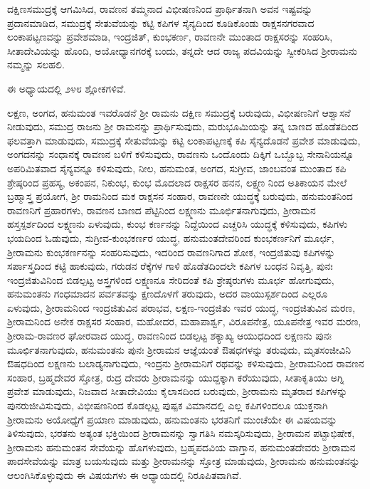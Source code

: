 ದಕ್ಷಿಣಸಮುದ್ರಕ್ಕೆ ಆಗಮಿಸಿದ, ರಾವಣನ ತಮ್ಮನಾದ ವಿಭೀಷಣನಿಂದ ಪ್ರಾರ್ಥಿತನಾಗಿ ಅವನ ಇಷ್ಟವನ್ನು ಪ್ರದಾನಮಾಡಿದ, ಸಮುದ್ರಕ್ಕೆ ಸೇತುವೆಯನ್ನು ಕಟ್ಟಿ ಕಪಿಗಳ ಸೈನ್ಯದಿಂದ ಕೂಡಿಕೊಂಡು ರಾಕ್ಷಸನಗರವಾದ ಲಂಕಾಪಟ್ಟಣವನ್ನು ಪ್ರವೇಶಮಾಡಿ, ಇಂದ್ರಜಿತ್, ಕುಂಭಕರ್ಣ, ರಾವಣನೇ ಮುಂತಾದ ರಾಕ್ಷಸರನ್ನು ಸಂಹರಿಸಿ, ಸೀತಾದೇವಿಯನ್ನು ಹೊಂದಿ, ಅಯೋಧ್ಯಾನಗರಕ್ಕೆ ಬಂದು, ತನ್ನದೇ ಆದ ರಾಜ್ಯ ಪದವಿಯನ್ನು ಸ್ವೀಕರಿಸಿದ ಶ‍್ರೀರಾಮನು ನಮ್ಮನ್ನು ಸಲಹಲಿ.

ಈ ಅಧ್ಯಾಯದಲ್ಲಿ ೨೪೮ ಶ್ಲೋಕಗಳಿವೆ.

ಲಕ್ಷಣ, ಅಂಗದ, ಹನುಮಂತ ಇವರೊಡನೆ ಶ‍್ರೀ ರಾಮನು ದಕ್ಷಿಣ ಸಮುದ್ರಕ್ಕೆ ಬರುವುದು, ವಿಭೀಷಣನಿಗೆ ಆಶ್ವಾಸನೆ ನೀಡುವುದು, ಸಮುದ್ರ ರಾಜನು ಶ‍್ರೀ ರಾಮನನ್ನು ಪ್ರಾರ್ಥಿಸುವುದು, ಮರುಭೂಮಿಯನ್ನು ತನ್ನ ಬಾಣದ ಹೊಡೆತದಿಂದ ಫಲವತ್ತಾಗಿ ಮಾಡುವುದು, ಸಮುದ್ರಕ್ಕೆ ಸೇತುವೆಯನ್ನು ಕಟ್ಟಿ ಲಂಕಾಪಟ್ಟಣಕ್ಕೆ ಕಪಿ ಸೈನ್ಯದೊಡನೆ ಪ್ರವೇಶ ಮಾಡುವುದು, ಅಂಗದನನ್ನು ಸಂಧಾನಕ್ಕೆ ರಾವಣನ ಬಳಿಗೆ ಕಳಿಸುವುದು, ರಾವಣನು ಒಂದೊಂದು ದಿಕ್ಕಿಗೆ ಒಬ್ಬೊಬ್ಬ ಸೇನಾನಿಯನ್ನೂ ಅಪರಿಮಿತವಾದ ಸೈನ್ಯವನ್ನೂ ಕಳಿಸುವುದು, ನೀಲ, ಹನುಮಂತ, ಅಂಗದ, ಸುಗ್ರೀವ, ಜಾಂಬವಂತ ಮುಂತಾದ ಕಪಿ ಶ್ರೇಷ್ಠರಿಂದ ಪ್ರಹಸ್ಯ, ಅಕಂಪನ, ನಿಕುಂಭ, ಕುಂಭ ಮೊದಲಾದ ರಾಕ್ಷಸರ ಹನನ, ಲಕ್ಷ್ಮಣ ನಿಂದ ಅತಿಕಾಯನ ಮೇಲೆ ಬ್ರಹ್ಮಾಸ್ತ್ರ ಪ್ರಯೋಗ, ಶ‍್ರೀ ರಾಮನಿಂದ ಮಕ ರಾಕ್ಷಸನ ಸಂಹಾರ, ರಾವಣನೇ ಯುದ್ಧಕ್ಕೆ ಬರುವುದು, ಹನುಮಂತನಿಂದ ರಾವಣನಿಗೆ ಪ್ರಹಾರಗಳು, ರಾವಣನ ಬಾಣದ ಪೆಟ್ಟಿನಿಂದ ಲಕ್ಷ್ಮಣನು ಮೂರ್ಛಿತನಾಗುವುದು, ಶ‍್ರೀರಾಮನ ಹಸ್ತಸ್ಪರ್ಶದಿಂದ ಲಕ್ಷ್ಮಣನು ಏಳುವುದು, ಕುಂಭ ಕರ್ಣನನ್ನು ನಿದ್ದೆಯಿಂದ ಎಚ್ಚರಿಸಿ ಯುದ್ಧಕ್ಕೆ ಕಳಿಸುವುದು, ಕಪಿಗಳು ಭಯದಿಂದ ಓಡುವುದು, ಸುಗ್ರೀವ-ಕುಂಭಕರ್ಣರ ಯುದ್ಧ, ಹನುಮಂತದೇವರಿಂದ ಕುಂಭಕರ್ಣನಿಗೆ ಮೂರ್ಛ, ಶ‍್ರೀರಾಮನು ಕುಂಭಕರ್ಣನನ್ನು ಸಂಹರಿಸುವುದು, ಇದರಿಂದ ರಾವಣನಿಗಾದ ಶೋಕ, ಇಂದ್ರಜಿತುವು ಕಪಿಗಳನ್ನು ಸರ್ಪಾಸ್ತ್ರದಿಂದ ಕಟ್ಟಿ ಹಾಕುವುದು, ಗರುಡನ ರೆಕ್ಕೆಗಳ ಗಾಳಿ ಹೊಡೆತದಿಂದಲೇ ಕಪಿಗಳ ಬಂಧನ ನಿವೃತ್ತಿ, ಪುನಃ ಇಂದ್ರಜಿತುವಿನಿಂದ ಬಿಡಲ್ಪಟ್ಟ ಅಸ್ತ್ರಗಳಿಂದ ಲಕ್ಷ್ಮಣನೂ ಸೇರಿದಂತೆ ಕಪಿ ಶ್ರೇಷ್ಠರುಗಳು ಮೂರ್ಛ ಹೋಗುವುದು, ಹನುಮಂತನು ಗಂಧಮಾದನ ಪರ್ವತವನ್ನು ಕ್ಷಣದೊಳಗೆ ತರುವುದು, ಅದರ ವಾಯುಸ್ಪರ್ಶದಿಂದ ಎಲ್ಲರೂ ಏಳುವುದು, ಶ‍್ರೀರಾಮನಿಂದ ಇಂದ್ರಜಿತುವಿನ ಪರಾಭವ, ಲಕ್ಷಣ-ಇಂದ್ರಜಿತು ಇವರ ಯುದ್ಧ, ಇಂದ್ರಜಿತುವಿನ ಮರಣ, ಶ‍್ರೀರಾಮನಿಂದ ಅನೇಕ ರಾಕ್ಷಸರ ಸಂಹಾರ, ಮಹೋದರ, ಮಹಾಪಾರ್ಶ್ವ, ವಿರೂಪನೇತ್ರ, ಯೂಪನೇತ್ರ ಇವರ ಮರಣ, ಶ‍್ರೀರಾಮ-ರಾವಣರ ಘೋರವಾದ ಯುದ್ಧ, ರಾವಣನಿಂದ ಬಿಡಲ್ಪಟ್ಟ ಶಕ್ಯಾಖ್ಯ ಆಯುಧದಿಂದ ಲಕ್ಷಣನು ಪುನಃ ಮೂರ್ಛಿತನಾಗುವುದು, ಹನುಮಂತನು ಪುನಃ ಶ‍್ರೀರಾಮನ ಆಜ್ಞೆಯಂತೆ ಔಷಧಗಳನ್ನು ತರುವುದು, ಮೃತಸಂಜೀವಿನಿ ಔಷಧದಿಂದ ಲಕ್ಷಣನು ಬಲಾಡ್ಯನಾಗುವುದು, ಇಂದ್ರನು ಶ‍್ರೀರಾಮನಿಗೆ ರಥವನ್ನು ಕಳಿಸುವುದು, ಶ‍್ರೀರಾಮನಿಂದ ರಾವಣನ ಸಂಹಾರ, ಬ್ರಹ್ಮದೇವರ ಸ್ತೋತ್ರ, ರುದ್ರ ದೇವರು ಶ‍್ರೀರಾಮನನ್ನು ಯುದ್ದಕ್ಕಾಗಿ ಕರೆಯುವುದು, ಸೀತಾಕೃತಿಯು ಅಗ್ನಿ ಪ್ರವೇಶ ಮಾಡುವುದು, ನಿಜವಾದ ಸೀತಾದೇವಿಯು ಕೈಲಾಸದಿಂದ ಬರುವುದು, ಶ‍್ರೀರಾಮನು ಮೃತರಾದ ಕಪಿಗಳನ್ನು ಪುನರುಜೀವಿಸುವುದು, ವಿಭೀಷಣನಿಂದ ಕೊಡಲ್ಪಟ್ಟ ಪುಷ್ಪಕ ವಿಮಾನದಲ್ಲಿ ಎಲ್ಲ ಕಪಿಗಳಿಂದಲೂ ಯುಕ್ತನಾಗಿ ಶ‍್ರೀರಾಮನು ಅಯೋಧ್ಯೆಗೆ ಪ್ರಯಾಣ ಮಾಡುವುದು, ಹನುಮಂತನು ಭರತನಿಗೆ ಮುಂಚೆಯೇ ಈ ವಿಷಯವನ್ನು ತಿಳಿಸುವುದು, ಭರತನು ಅತ್ಯಂತ ಭಕ್ತಿಯಿಂದ ಶ‍್ರೀರಾಮನನ್ನು ಸ್ವಾಗತಿಸಿ ನಮಸ್ಕರಿಸುವುದು, ಶ‍್ರೀರಾಮನ ಪಟ್ಟಾಭಿಷೇಕ, ಶ‍್ರೀರಾಮನು ಹನುಮಂತನ ಸೇವೆಯನ್ನು ಹೊಗಳುವುದು, ಬ್ರಹ್ಮಪದವಿಯ ವಾಗ್ತಾನ, ಹನುಮಂತದೇವರು ಶ‍್ರೀರಾಮನ ಪಾದಸೇವೆಯನ್ನು ಮಾತ್ರ ಬಯಸುವುದು ಮತ್ತು ಶ‍್ರೀರಾಮನನ್ನು ಸ್ತೋತ್ರ ಮಾಡುವುದು, ಶ‍್ರೀರಾಮನು ಹನುಮಂತನನ್ನು ಆಲಂಗಿಸಿಕೊಳ್ಳುವುದು ಈ ವಿಷಯಗಳು ಈ ಅಧ್ಯಾಯದಲ್ಲಿ ನಿರೂಪಿತವಾಗಿವೆ.


